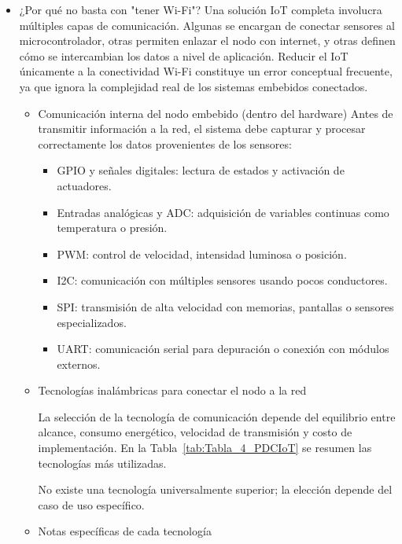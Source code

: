 \begin{itemize}
    \item ¿Por qué no basta con "tener Wi-Fi"?
    Una solución IoT completa involucra múltiples capas de comunicación. Algunas se encargan de conectar sensores al microcontrolador, otras permiten enlazar el nodo con internet, y otras definen cómo se intercambian los datos a nivel de aplicación. Reducir el IoT únicamente a la conectividad Wi-Fi constituye un error conceptual frecuente, ya que ignora la complejidad real de los sistemas embebidos conectados.

    \begin{itemize}
        \item Comunicación interna del nodo embebido (dentro del hardware)
        Antes de transmitir información a la red, el sistema debe capturar y procesar correctamente los datos provenientes de los sensores:

        \begin{itemize}
            \item GPIO y señales digitales: lectura de estados y activación de actuadores.
            \item Entradas analógicas y ADC: adquisición de variables continuas como temperatura o presión.
            \item PWM: control de velocidad, intensidad luminosa o posición.
            \item I2C: comunicación con múltiples sensores usando pocos conductores.
            \item SPI: transmisión de alta velocidad con memorias, pantallas o sensores especializados.
            \item UART: comunicación serial para depuración o conexión con módulos externos.
        \end{itemize}

        \item Tecnologías inalámbricas para conectar el nodo a la red

        La selección de la tecnología de comunicación depende del equilibrio entre alcance, consumo energético, velocidad de transmisión y costo de implementación. En la Tabla~\ref{tab:Tabla_4_PDCIoT} se resumen las tecnologías más utilizadas.

        

        No existe una tecnología universalmente superior; la elección depende del caso de uso específico.

        \item Notas específicas de cada tecnología


\end{itemize}
\end{itemize}
